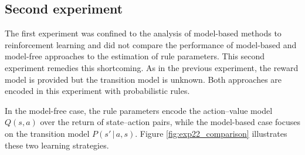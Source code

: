 \subsection{Second experiment}
\label{rrlearning-exp22}

The first experiment was confined to the analysis of model-based methods to reinforcement learning and did not compare the performance of model-based and model-free approaches to the estimation of rule parameters.  This second experiment remedies this shortcoming. As in the previous experiment, the reward model is provided but the transition model is unknown.  Both approaches are encoded in this experiment with probabilistic rules.

In the model-free case, the rule parameters encode the action--value model $Q(s,a)$ over the return of state--action pairs, while the model-based case focuses on the transition model $P(s'\, | \, a,s)$.  Figure \ref{fig:exp22_comparison} illustrates these two learning strategies.  

